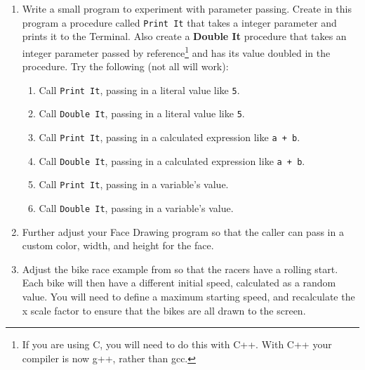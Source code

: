 \begin{enumerate}
  \item Write a small program to experiment with parameter passing. Create in this program a procedure called \texttt{Print It} that takes a integer parameter and prints it to the Terminal. Also create a  \textbf{Double It} procedure that takes an integer parameter passed by reference\footnote{If you are using C, you will need to do this with C++. With C++ your compiler is now g++, rather than gcc.} and has its value doubled in the procedure. Try the following (not all will work):
  \begin{enumerate}
    \item Call \texttt{Print It}, passing in a literal value like \texttt{5}.
    \item Call \texttt{Double It}, passing in a literal value like \texttt{5}.
    \item Call \texttt{Print It}, passing in a calculated expression like \texttt{a + b}.
    \item Call \texttt{Double It}, passing in a calculated expression like \texttt{a + b}.
    \item Call \texttt{Print It}, passing in a variable's value.
    \item Call \texttt{Double It}, passing in a variable's value.
  \end{enumerate}
  \item Further adjust your Face Drawing program so that the caller can pass in a custom color, width, and height for the face.
  \item Adjust the bike race example from  so that the racers have a rolling start. Each bike will then have a different initial speed, calculated as a random value. You will need to define a maximum starting speed, and recalculate the x scale factor to ensure that the bikes are all drawn to the screen.
\end{enumerate}

